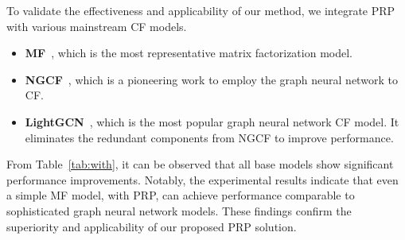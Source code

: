 To validate the effectiveness and applicability of our method, we integrate PRP with various mainstream CF models.
\begin{itemize}
    \item \textbf{MF}~\cite{RFG12}, which is the most representative matrix factorization model.
    \item \textbf{NGCF}~\cite{WHW19}, which is a pioneering work to employ the graph neural network to CF.
    \item \textbf{LightGCN}~\cite{HDW20}, which is the most popular graph neural network CF model. It eliminates the redundant components from NGCF to improve performance. 
\end{itemize}
From Table~\ref{tab:with}, it can be observed that all base models show significant performance improvements. Notably, the experimental results indicate that even a simple MF model, with PRP, can achieve performance comparable to sophisticated graph neural network models. These findings confirm the superiority and applicability of our proposed PRP solution.

